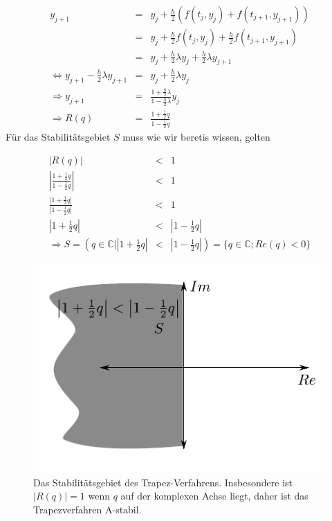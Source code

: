 \documentclass[10pt,a4paper]{article}
\begin{document}
\begin{bsp}


\begin{eqnarray*}
y_{j+1}&=&y_j + \frac{h}{2} \left(f(t_{j},y_{j}) + f(t_{j+1},y_{j+1}) \right)  \\
&=&y_j + \frac{h}{2} f(t_{j},y_{j}) + \frac{h}{2} f(t_{j+1},y_{j+1})\\
&=& y_j +  \frac{h}{2} \lambda y_{j} + \frac{h}{2} \lambda y_{j+1} \\
\Leftrightarrow y_{j+1}- \frac{h}{2} \lambda y_{j+1} &=&  y_j +  \frac{h}{2} \lambda y_{j} \\
\Rightarrow y_{j+1}&=&\frac{1+\frac{h}{2} \lambda}{1-\frac{h}{2} \lambda} y_j\\
\Rightarrow R(q)&=& \frac{1+\frac{1}{2}q}{1-\frac{1}{2}q}
\end{eqnarray*}
Für das Stabilitätsgebiet $S$ muss wie wir beretis wissen, gelten



\begin{eqnarray*}
|R(q)|&<&1 \\
\left| \frac{1+\frac{1}{2}q}{1-\frac{1}{2}q} \right| &<&1\\
  \frac{\left| 1+\frac{1}{2}q \right|}{\left| 1-\frac{1}{2}q \right|} &<&1\\
 \left| 1+\frac{1}{2}q\right| &<&\left| 1-\frac{1}{2}q\right| \\ 
\Rightarrow S=\left( q \in \mathbb{C} | \left| 1+\frac{1}{2}q\right| \right. &<&\left. \left| 1-\frac{1}{2}q\right| \right) = \{q \in \mathbb{C}; Re(q)<0\}
\end{eqnarray*}

\begin{figure}[H]
\includegraphics[width=\textwidth]{images/stability_trapez}
\caption{Das Stabilitätsgebiet des Trapez-Verfahrens. Insbesondere ist $|R(q)|=1$ wenn $q$ auf der komplexen Achse liegt, daher ist das Trapezverfahren A-stabil.}
\end{figure}

\end{bsp}
\end{document}
